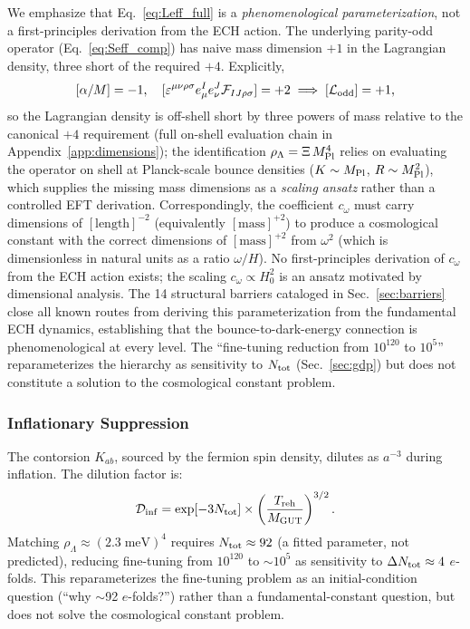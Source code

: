 \documentclass[aps,prd,twocolumn,superscriptaddress,showpacs,preprintnumbers,nofootinbib,longbibliography,floatfix]{revtex4-2}
\newcommand{\Dinf}{\mathcal{D}_{\rm inf}}
\newcommand{\MPl}{M_{\rm Pl}}
\begin{document}
We emphasize that Eq.~\eqref{eq:Leff_full} is a \textit{phenomenological parameterization}, not a first-principles derivation from the ECH action. The underlying parity-odd operator (Eq.~\ref{eq:Seff_comp}) has naive mass dimension $+1$ in the Lagrangian density, three short of the required $+4$. Explicitly,
\begin{equation}\label{eq:dimcount}
[\alpha/M] = -1, \quad [\varepsilon^{\mu\nu\rho\sigma}e^I_\mu e^J_\nu \mathcal{F}_{IJ\rho\sigma}] = +2 \;\Longrightarrow\; [\mathcal{L}_{\rm odd}] = +1,
\end{equation}
so the Lagrangian density is off-shell short by three powers of mass relative to the canonical $+4$ requirement (full on-shell evaluation chain in Appendix~\ref{app:dimensions}); the identification $\rho_\Lambda = \Xi\,\MPl^4$ relies on evaluating the operator on shell at Planck-scale bounce densities ($K \sim \MPl$, $R\sim\MPl^2$), which supplies the missing mass dimensions as a \textit{scaling ansatz} rather than a controlled EFT derivation. Correspondingly, the coefficient $c_\omega$ must carry dimensions of $[\text{length}]^{-2}$ (equivalently $[\text{mass}]^{+2}$) to produce a cosmological constant with the correct dimensions of $[\text{mass}]^{+2}$ from $\omega^2$ (which is dimensionless in natural units as a ratio $\omega/H$). No first-principles derivation of $c_\omega$ from the ECH action exists; the scaling $c_\omega \propto H_0^2$ is an ansatz motivated by dimensional analysis. The 14 structural barriers cataloged in Sec.~\ref{sec:barriers} close all known routes from deriving this parameterization from the fundamental ECH dynamics, establishing that the bounce-to-dark-energy connection is phenomenological at every level. The ``fine-tuning reduction from $10^{120}$ to $10^5$'' reparameterizes the hierarchy as sensitivity to $N_{\rm tot}$ (Sec.~\ref{sec:gdp}) but does not constitute a solution to the cosmological constant problem.

\subsubsection{Inflationary Suppression}\label{sec:dilution}

The contorsion $K_{ab}$, sourced by the fermion spin density, dilutes as $a^{-3}$ during inflation. The dilution factor is:
\begin{equation}\label{eq:Dinf}
\Dinf = \exp[-3N_{\rm tot}] \times \left(\frac{T_{\rm reh}}{M_{\rm GUT}}\right)^{3/2}.
\end{equation}
Matching $\rho_\Lambda \approx (2.3\;\text{meV})^4$ requires $N_{\rm tot} \approx 92$ (a fitted parameter, not predicted), reducing fine-tuning from $10^{120}$ to $\sim 10^5$ as sensitivity to $\Delta N_{\rm tot} \approx 4$ $e$-folds. This reparameterizes the fine-tuning problem as an initial-condition question (``why $\sim$92 $e$-folds?'') rather than a fundamental-constant question, but does not solve the cosmological constant problem.
\end{document}
